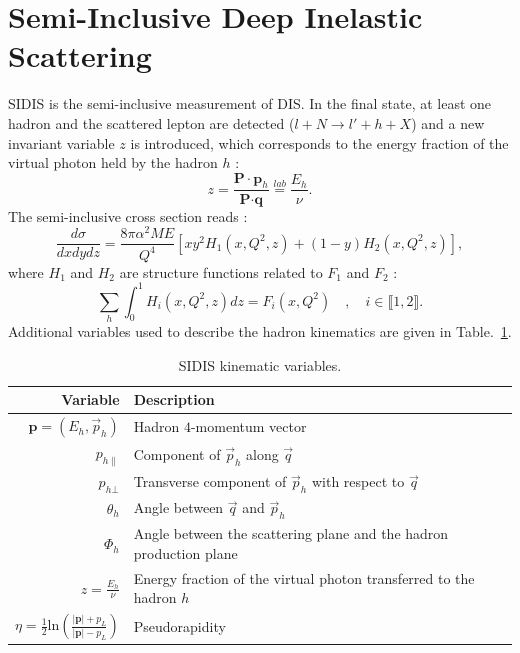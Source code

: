\section{Semi-Inclusive Deep Inelastic Scattering}

SIDIS is the semi-inclusive measurement of DIS. In the final state, at least one hadron and the scattered lepton are detected ($l+N \rightarrow l'+h+X$) and a new invariant variable $z$ is introduced, which corresponds to the energy fraction of the virtual photon held by the hadron $h$ :
%
\begin{equation}
  z = \frac{\textbf{P}\cdot\textbf{p}_h}{\textbf{P}\cdot\textbf{q}} \stackrel{lab}{=} \frac{E_h}{\nu}.
  \label{eq:SIDIS}
\end{equation}
%
The semi-inclusive cross section reads \cite{SIDISXS}:
%
\begin{equation}
  \frac{d\sigma}{dxdydz} = \frac{8\pi\alpha^2ME}{Q^4}\left[xy^2H_1(x,Q^2,z)+(1-y)H_2(x,Q^2,z)\right],
  \label{eq:SIDISXS}
\end{equation}
%
where $H_1$ and $H_2$ are structure functions related to $F_1$ and $F_2$ \cite{BERGER,SIDISXS} :
%
\begin{equation}
  \sum\limits_{h}\int_{0}^{1} H_i(x,Q^2,z)dz = F_i(x,Q^2)\quad,\quad i \in  \llbracket1,2\rrbracket.
\end{equation}
%
Additional variables used to describe the hadron kinematics are given in Table.~\ref{tab:SIDIS}.

\begin{table}[h!]
  \caption{SIDIS kinematic variables.}
  \label{tab:SIDIS}
  \begin{tabularx}{\textwidth}{r|lX}
    \hline
    \hline
    Variable & Description \\
    \hline
    \hline
    $\textbf{p}=(E_h,\vec{p}_h)$ & Hadron $4$-momentum vector \\
    $p_{h\|}$ & Component of $\vec{p}_h$ along $\vec{q}$ \\
    $p_{h\bot}$ & Transverse component of $\vec{p}_h$ with respect to $\vec{q}$ \\
    $\theta_h$ & Angle between $\vec{q}$ and $\vec{p}_h$ \\
    $\Phi_h$ & Angle between the scattering plane and the hadron production plane \\
    $z=\frac{E_h}{\nu}$ & Energy fraction of the virtual photon transferred to the hadron $h$ \\
    $\eta=\frac{1}{2}\text{ln}\left(\frac{|\mathbf{p}|+p_L}{|\mathbf{p}|-p_L} \right)$ & Pseudorapidity \\
    \hline
    \hline
  \end{tabularx}
\end{table}

